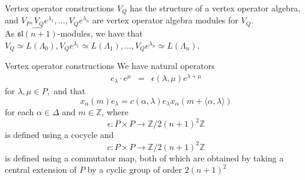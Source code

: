 \documentclass{beamer}
\begin{document}
\begin{frame}{Vertex operator constructions}
\pause
\vspace{0.1in}
$V_Q$ has the structure of a vertex operator algebra, and $V_P, V_Qe^{\lambda_1},\dots ,V_Q e^{\lambda_n}$
are vertex operator algebra modules for $V_Q$.\\
\pause
\vspace{0.1in}
As $\widehat{\mathfrak{sl}(n+1)}$-modules, we have that
$V_Q \simeq L(\Lambda_0), V_Qe^{\lambda_1} \simeq L(\Lambda_1), \dots , V_Qe^{\lambda_n} \simeq L(\Lambda_n)$. 
\end{frame}

\begin{frame}{Vertex operator constructions}
  We have natural operators 
\begin{eqnarray*}
e_{\lambda} \cdot e^{\mu}&=&
{\epsilon(\lambda, \mu)}e^{\lambda + \mu} 
\end{eqnarray*}
for $\lambda, \mu \in P,$  and that 
$$
x_\alpha(m) e_\lambda = c(\alpha,\lambda)e_\lambda x_\alpha(m + \langle \alpha, \lambda \rangle)
$$
for each $\alpha \in \Delta$ and $m \in \mathbb{Z}$, where 
$$
\epsilon: P \times P \rightarrow \mathbb{Z}/2(n+1)^2\mathbb{Z}
$$
is defined using 
a cocycle 
and 
$$
c: P \times P \rightarrow \mathbb{Z}/2(n+1)^2\mathbb{Z}
$$
is defined using a commutator map, both of which are 
 obtained by taking a central extension of $P$ by a cyclic group of order $2(n+1)^2$
\end{frame}


\end{document}
